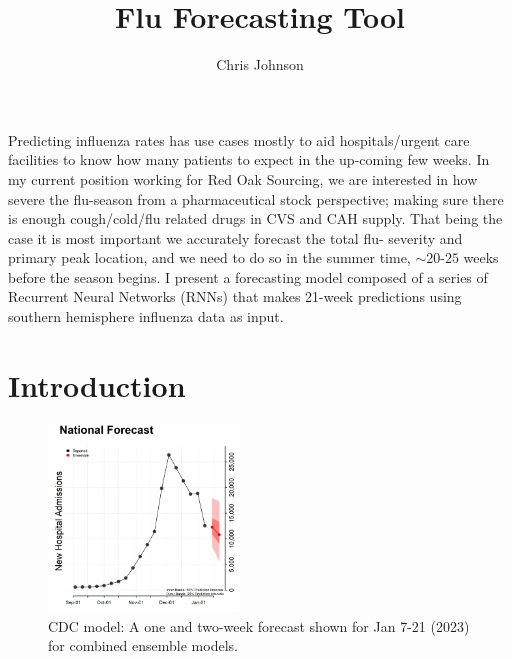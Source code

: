\documentclass[12pt,a4paper,english]{article}
\begin{document}
\title{Flu Forecasting Tool}
\author{Chris Johnson}
\maketitle

Predicting influenza rates has use cases mostly to aid hospitals/urgent care facilities to know how many patients to expect in the up-coming few weeks. In my current position working for Red Oak Sourcing, we are interested in how severe the flu-season from a pharmaceutical stock perspective; making sure there is enough cough/cold/flu related drugs in CVS and CAH supply. That being the case it is most important we accurately forecast the total flu- severity and primary peak location, and we need to do so in the summer time, $\sim 20$-$25$ weeks before the season begins. I present a forecasting model composed of a series of Recurrent Neural Networks (RNNs) that makes 21-week predictions using southern hemisphere influenza data as input.

\section{Introduction}




\begin{figure}[h]
		\begin{center}
		\includegraphics[width=0.45\textwidth]{Pictures/cdc_model.png}
		\caption{CDC model: A one and two-week forecast shown for Jan 7-21 (2023) for combined ensemble models.}
		\end{center}
		\label{fig:cdcc}
	\end{figure}

	
\FloatBarrier
\end{document}
